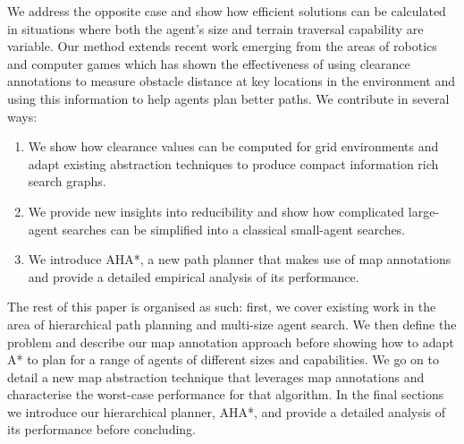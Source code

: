 We address the opposite case and show how efficient solutions can be calculated in situations where both the agent's size and terrain traversal capability are variable. Our method extends recent work emerging from the areas of robotics and computer games which has shown the effectiveness of using clearance annotations to measure obstacle distance at key locations in the environment and using this information to help agents plan better paths. We contribute in several ways:
\begin{enumerate}
\item{We show how clearance values can be computed for grid environments and adapt existing abstraction techniques to produce compact information rich search graphs.}
\item{We provide new insights into reducibility and show how complicated large-agent searches can be simplified into a classical small-agent searches.}
\item{We introduce AHA*, a new path planner that makes use of map annotations and provide a detailed empirical analysis of its performance. }
\end{enumerate} 

The rest of this paper is organised as such: first, we cover existing work in the area of hierarchical path planning and multi-size agent search. We then define the problem and describe our map annotation approach before showing how to adapt A* to plan for a range of agents of different sizes and capabilities. We go on to detail a new map abstraction technique that leverages map annotations and characterise the worst-case performance for that algorithm. In the final sections we introduce our hierarchical planner, AHA*, and provide a detailed analysis of its performance before concluding.
